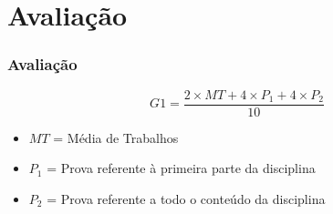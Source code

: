 \documentclass[aspectratio=169]{beamer}
\begin{document}
\section{Avalia\c{c}\~ao}

\begin{frame}\frametitle{Avalia\c{c}\~ao}
\[
G1 = \frac{ 2 \times MT + 4 \times P_1 + 4 \times P_2}{10}
\]
\begin{itemize}
	\item $MT$ = Média de Trabalhos
 	\item $P_1$ = Prova referente à primeira parte da disciplina
	\item $P_2$ = Prova referente a todo o conteúdo da disciplina
\end{itemize}
\end{frame}

\end{document}
